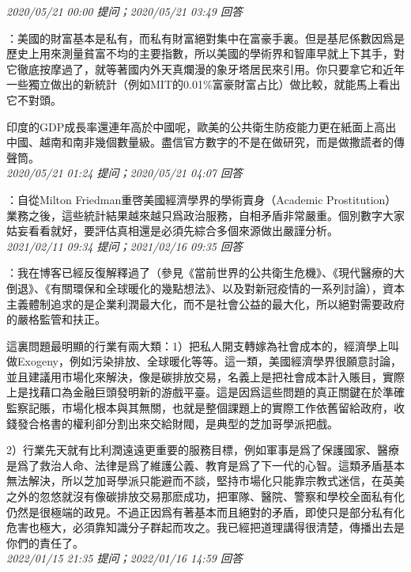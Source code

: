 \documentclass[twocolumn]{ctexart}
\begin{document}
\textit{\hfill\noindent\small 2020/05/21 00:00 提问；2020/05/21 03:49 回答}

：美國的財富基本是私有，而私有財富絕對集中在富豪手裏。但是基尼係數因爲是歷史上用來測量貧富不均的主要指數，所以美國的學術界和智庫早就上下其手，對它徹底按摩過了，就等著國内外天真爛漫的象牙塔居民來引用。你只要拿它和近年一些獨立做出的新統計（例如MIT的0.01\%富豪財富占比）做比較，就能馬上看出它不對頭。

印度的GDP成長率還連年高於中國呢，歐美的公共衛生防疫能力更在紙面上高出中國、越南和南非幾個數量級。盡信官方數字的不是在做研究，而是做撒謊者的傳聲筒。
\\

\textit{\hfill\noindent\small 2020/05/21 01:24 提问；2020/05/21 04:07 回答}

：自從Milton Friedman重啓美國經濟學界的學術賣身（Academic Prostitution）業務之後，這些統計結果越來越只爲政治服務，自相矛盾非常嚴重。個別數字大家姑妄看看就好，要評估真相還是必須先綜合多個來源做出嚴謹分析。
\\

\textit{\hfill\noindent\small 2021/02/11 09:34 提问；2021/02/16 09:35 回答}

：我在博客已經反復解釋過了（參見《當前世界的公共衛生危機》、《現代醫療的大倒退》、《有關環保和全球暖化的幾點想法》、以及對新冠疫情的一系列討論），資本主義體制追求的是企業利潤最大化，而不是社會公益的最大化，所以絕對需要政府的嚴格監管和扶正。

這裏問題最明顯的行業有兩大類：1）把私人開支轉嫁為社會成本的，經濟學上叫做Exogeny，例如污染排放、全球暖化等等。這一類，美國經濟學界很願意討論，並且建議用市場化來解決，像是碳排放交易，名義上是把社會成本計入賬目，實際上是找藉口為金融巨頭發明新的游戲平臺。這是因爲這些問題的真正關鍵在於準確監察記賬，市場化根本與其無關，也就是整個課題上的實際工作依舊留給政府，收錢發合格書的權利卻分割出來交給財閥，是典型的芝加哥學派把戲。

2）行業先天就有比利潤遠遠更重要的服務目標，例如軍事是爲了保護國家、醫療是爲了救治人命、法律是爲了維護公義、教育是爲了下一代的心智。這類矛盾基本無法解決，所以芝加哥學派只能避而不談，堅持市場化只能靠宗教式迷信，在英美之外的忽悠就沒有像碳排放交易那麽成功，把軍隊、醫院、警察和學校全面私有化仍然是很極端的政見。不過正因爲有著基本而且絕對的矛盾，即使只是部分私有化危害也極大，必須靠知識分子群起而攻之。我已經把道理講得很清楚，傳播出去是你們的責任了。
\\

\textit{\hfill\noindent\small 2022/01/15 21:35 提问；2022/01/16 14:59 回答}
\end{document}
